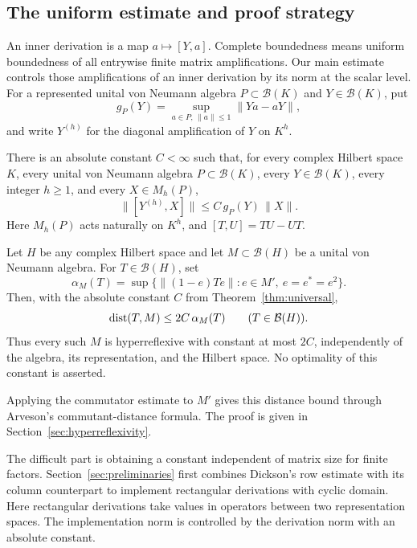 \subsection{The uniform estimate and proof strategy}

An inner derivation is a map $a\mapsto[Y,a]$. Complete boundedness
means uniform boundedness of all entrywise finite matrix amplifications.
Our main estimate controls those amplifications of an inner derivation
by its norm at the scalar level.  For a represented unital
von Neumann algebra \(P\subset\mathcal B(K)\) and
\(Y\in\mathcal B(K)\), put
\[
  g_P(Y)=\sup_{a\in P,\,\|a\|\le1}\|Ya-aY\|,
\]
and write \(Y^{(h)}\) for the diagonal amplification of \(Y\) on
\(K^h\).

\begin{theorem}\label{thm:universal}
There is an absolute constant \(C<\infty\) such that, for every complex
Hilbert space \(K\), every unital von Neumann algebra
\(P\subset\mathcal B(K)\), every \(Y\in\mathcal B(K)\), every integer
\(h\ge1\), and every \(X\in M_h(P)\),
\begin{equation}\label{eq:universal}
  \|[Y^{(h)},X]\|\le C\,g_P(Y)\,\|X\|.
\end{equation}
Here \(M_h(P)\) acts naturally on \(K^h\), and \([T,U]=TU-UT\).
\end{theorem}

\begin{corollary}\label{cor:hyperreflexivity}
Let \(H\) be any complex Hilbert space and let
\(M\subset\mathcal B(H)\) be a unital von Neumann algebra. For
\(T\in\mathcal B(H)\), set
\[
 \alpha_M(T)=\sup\{\|(1-e)Te\|:e\in M',\ e=e^*=e^2\}.
\]
Then, with the absolute constant \(C\) from Theorem~\ref{thm:universal},
\begin{equation}\label{eq:universal-hyperreflexivity}
 \operatorname{dist}(T,M)\le 2C\,\alpha_M(T)\qquad(T\in\mathcal B(H)).
\end{equation}
Thus every such \(M\) is hyperreflexive with constant at most \(2C\),
independently of the algebra, its representation, and the Hilbert space.
No optimality of this constant is asserted.
\end{corollary}

Applying the commutator estimate to \(M'\) gives this distance bound
through Arveson's commutant-distance formula. The proof is given in
Section~\ref{sec:hyperreflexivity}.


The difficult part is obtaining a constant independent of matrix size
for finite factors. Section~\ref{sec:preliminaries} first combines
Dickson's row estimate \citep[Lemma~2.9]{Dickson2014} with its column
counterpart to implement rectangular derivations with cyclic domain.
Here rectangular derivations take values in operators between two
representation spaces. The implementation norm is controlled by the derivation norm with an
absolute constant.

